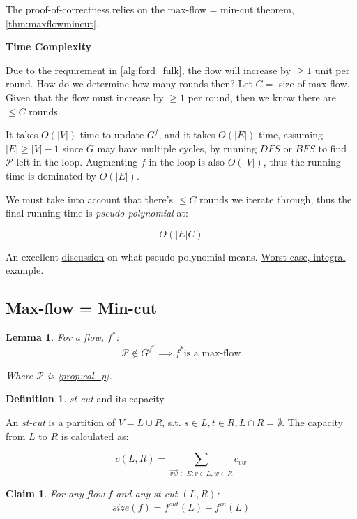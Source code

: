 \documentclass{article}
\newtheorem{claim}[theorem]{Claim}
\newtheorem{lemma}[theorem]{Lemma}
\theoremstyle{definition}
\newtheorem{definition}{Definition}[section]
\begin{document}
The proof-of-correctness relies on the max-flow = min-cut theorem, \ref{thm:maxflowmincut}. 

\textbf{Time Complexity}

Due to the requirement in \ref{alg:ford_fulk}, the flow will increase by $\geq 1$ unit per round. How do we determine how many rounds then? Let $C=$ size of max flow. Given that the flow must increase by $\geq 1$ per round, then we know there are $\leq C$ rounds. 

It takes $O(|V|)$ time to update $G^f$, and it takes $O(|E|)$ time, assuming $|E| \geq |V|-1$ since $G$ may have multiple cycles, by running $DFS$ or $BFS$ to find $\mathcal{P}$ left in the loop. Augmenting $f$ in the loop is also $O(|V|)$, thus the running time is dominated by $O(|E|)$. 

We must take into account that there's $\leq C$ rounds we iterate through, thus the final running time is \textit{pseudo-polynomial} at:

$$O(|E|C)$$

An excellent \href{https://stackoverflow.com/questions/19649026/is-network-flow-pseudo-polynomial-time}{discussion} on what pseudo-polynomial means. \href{https://en.wikipedia.org/wiki/Ford%E2%80%93Fulkerson_algorithm#Integral_example}{Worst-case, integral example}.

\subsection{Max-flow = Min-cut}
\begin{lemma}
\label{lem:aug_path}
For a flow, $f^*$: $$\mathcal{P} \notin G^{f^*} \implies f^* \text{is a max-flow}$$
	
Where $\mathcal{P}$ is \ref{prop:cal_p}.
\end{lemma}

\begin{definition}{\textit{st-cut} and its capacity}
\label{def:st_cut_cap}

An \textit{st-cut} is a partition of $V = L \cup R$, s.t. $s \in L, t \in R, L \cap R = \emptyset$. The capacity from $L$ to $R$ is calculated as:

$$c(L,R) = \sum_{\overrightarrow{vw} \in E : v \in L, w \in R} c_{vw}$$
\end{definition}

\begin{claim}
\label{clm:in_out_flow}
For any flow $f$ and any st-cut $(L,R)$:
$$size(f) = f^{out} (L) - f^{in} (L)$$
\end{claim}
\end{document}
